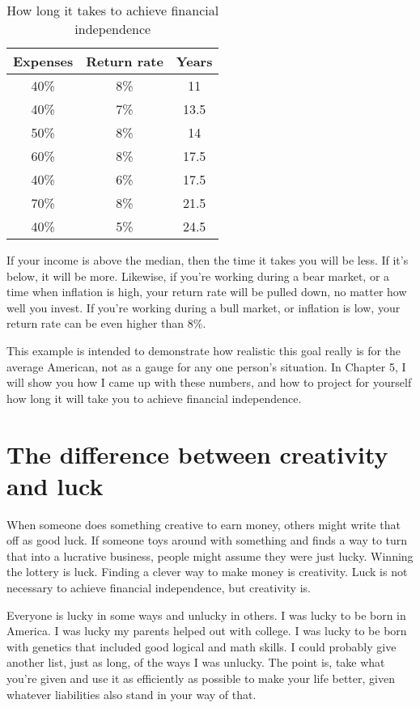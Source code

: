 \begin{table}[ht]
\caption{How long it takes to achieve financial independence}
\centering
\begin{tabular}{c c c}
\hline\hline
Expenses & Return rate & Years \\
\hline
40\% & 8\% & 11 \\
40\% & 7\% & 13.5 \\
50\% & 8\% & 14 \\
60\% & 8\% & 17.5 \\
40\% & 6\% & 17.5 \\
70\% & 8\% & 21.5 \\
40\% & 5\% & 24.5 \\
\hline
\end{tabular}
\end{table}

If your income is above the median, then the time it takes you will be less. If it's below, it will be more. Likewise, if you're working during a bear market, or a time when inflation is high, your return rate will be pulled down, no matter how well you invest. If you're working during a bull market, or inflation is low, your return rate can be even higher than 8\%.

This example is intended to demonstrate how realistic this goal really is for the average American, not as a gauge for any one person's situation. In Chapter 5, I will show you how I came up with these numbers, and how to project for yourself how long it will take you to achieve financial independence.

\section{The difference between creativity and luck}
When someone does something creative to earn money, others might write that off as good luck. If someone toys around with something and finds a way to turn that into a lucrative business, people might assume they were just lucky. Winning the lottery is luck. Finding a clever way to make money is creativity. Luck is not necessary to achieve financial independence, but creativity is.

Everyone is lucky in some ways and unlucky in others. I was lucky to be born in America. I was lucky my parents helped out with college. I was lucky to be born with genetics that included good logical and math skills. I could probably give another list, just as long, of the ways I was unlucky. The point is, take what you're given and use it as efficiently as possible to make your life better, given whatever liabilities also stand in your way of that.

